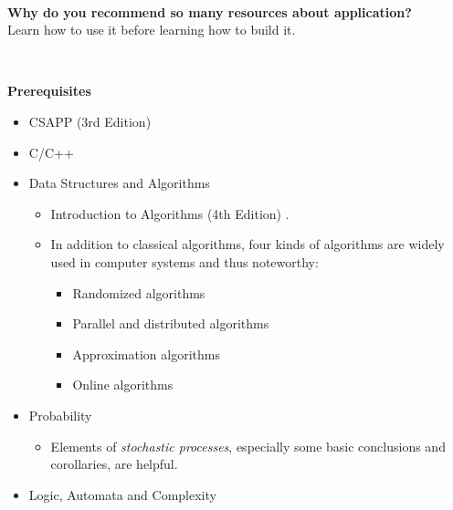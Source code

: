\documentclass{article}
\begin{document}
~

\noindent
\textbf{Why do you recommend so many resources about application?}\\
Learn how to use it before learning how to build it.

~

\noindent
\textbf{Prerequisites}
\begin{itemize}
    \item CSAPP (3rd Edition) \cite{bryant2015computer}
    \item C/C++
    \item Data Structures and Algorithms
    \begin{itemize}
        \item Introduction to Algorithms (4th Edition) \cite{cormen2009introduction}.
        \item In addition to classical algorithms, four kinds of algorithms are widely used in computer systems and thus noteworthy:
        \begin{itemize}
            \item Randomized algorithms
            \item Parallel and distributed algorithms
            \item Approximation algorithms
            \item Online algorithms
        \end{itemize}
    \end{itemize}
    \item Probability
    \begin{itemize}
        \item Elements of \emph{stochastic processes}, especially some basic conclusions and corollaries, are helpful.
    \end{itemize}
    \item Logic, Automata and Complexity
\end{itemize}
\end{document}
